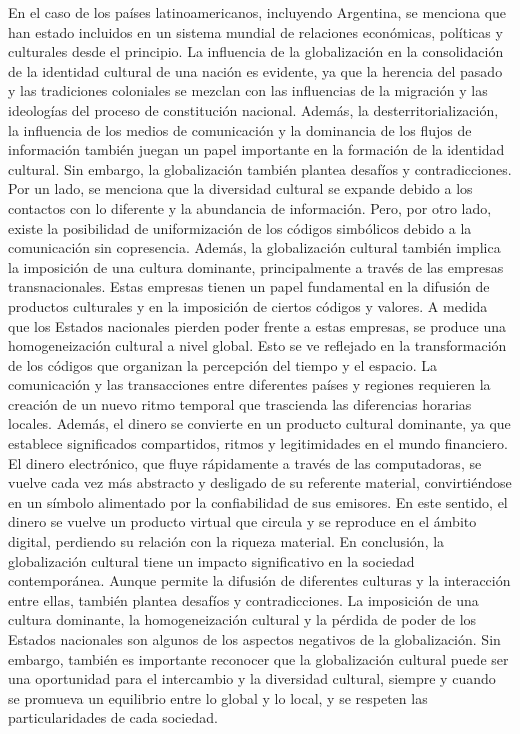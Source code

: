 \documentclass{article}
\theoremstyle{mytheoremstyle}
\theoremstyle{mytheoremstyle}
\theoremstyle{myproblemstyle}
\begin{document}
En el caso de los países latinoamericanos, incluyendo Argentina, se menciona que han estado incluidos en un sistema mundial de relaciones económicas, políticas y culturales desde el principio. La influencia de la globalización en la consolidación de la identidad cultural de una nación es evidente, ya que la herencia del pasado y las tradiciones coloniales se mezclan con las influencias de la migración y las ideologías del proceso de constitución nacional. Además, la desterritorialización, la influencia de los medios de comunicación y la dominancia de los flujos de información también juegan un papel importante en la formación de la identidad cultural.
\vspace{1cm}
Sin embargo, la globalización también plantea desafíos y contradicciones. 
\newline Por un lado, se menciona que la diversidad cultural se expande debido a los contactos con lo diferente y la abundancia de información. Pero, por otro lado, existe la posibilidad de uniformización de los códigos simbólicos debido a la comunicación sin copresencia.
\vspace{1cm}
\newline
Además, la globalización cultural también implica la imposición de una cultura dominante, principalmente a través de las empresas transnacionales. Estas empresas tienen un papel fundamental en la difusión de productos culturales y en la imposición de ciertos códigos y valores. A medida que los Estados nacionales pierden poder frente a estas empresas, se produce una homogeneización cultural a nivel global.
\newline Esto se ve reflejado en la transformación de los códigos que organizan la percepción del tiempo y el espacio. La comunicación y las transacciones entre diferentes países y regiones requieren la creación de un nuevo ritmo temporal que trascienda las diferencias horarias locales. 
Además, el dinero se convierte en un producto cultural dominante, ya que establece significados compartidos, ritmos y legitimidades en el mundo financiero. El dinero electrónico, que fluye rápidamente a través de las computadoras, se vuelve cada vez más abstracto y desligado de su referente material, convirtiéndose en un símbolo alimentado por la confiabilidad de sus emisores. En este sentido, el dinero se vuelve un producto virtual que circula y se reproduce en el ámbito digital, perdiendo su relación con la riqueza material. 
\vspace{1cm}
\newline
En conclusión, la globalización cultural tiene un impacto significativo en la sociedad contemporánea. Aunque permite la difusión de diferentes culturas y la interacción entre ellas, también plantea desafíos y contradicciones. La imposición de una cultura dominante, la homogeneización cultural y la pérdida de poder de los Estados nacionales son algunos de los aspectos negativos de la globalización. Sin embargo, también es importante reconocer que la globalización cultural puede ser una oportunidad para el intercambio y la diversidad cultural, siempre y cuando se promueva un equilibrio entre lo global y lo local, y se respeten las particularidades de cada sociedad.

    
\end{document}
